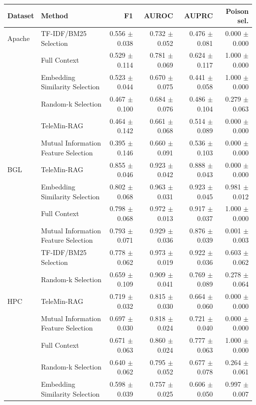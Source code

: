\begin{tabular}{llrrrr}
\toprule
Dataset & Method & F1 & AUROC & AUPRC & Poison sel. \\
\midrule
Apache & TF-IDF/BM25 Selection & 0.556 $\pm$ 0.038 & 0.732 $\pm$ 0.052 & 0.476 $\pm$ 0.081 & 0.000 $\pm$ 0.000 \\
 & Full Context & 0.529 $\pm$ 0.114 & 0.781 $\pm$ 0.069 & 0.624 $\pm$ 0.117 & 1.000 $\pm$ 0.000 \\
 & Embedding Similarity Selection & 0.523 $\pm$ 0.044 & 0.670 $\pm$ 0.075 & 0.441 $\pm$ 0.058 & 1.000 $\pm$ 0.000 \\
 & Random-k Selection & 0.467 $\pm$ 0.100 & 0.684 $\pm$ 0.076 & 0.486 $\pm$ 0.104 & 0.279 $\pm$ 0.063 \\
 & TeleMin-RAG & 0.464 $\pm$ 0.142 & 0.661 $\pm$ 0.068 & 0.514 $\pm$ 0.089 & 0.000 $\pm$ 0.000 \\
 & Mutual Information Feature Selection & 0.395 $\pm$ 0.146 & 0.660 $\pm$ 0.091 & 0.536 $\pm$ 0.103 & 0.000 $\pm$ 0.000 \\
\midrule
BGL & TeleMin-RAG & 0.855 $\pm$ 0.046 & 0.923 $\pm$ 0.042 & 0.888 $\pm$ 0.043 & 0.000 $\pm$ 0.000 \\
 & Embedding Similarity Selection & 0.802 $\pm$ 0.068 & 0.963 $\pm$ 0.031 & 0.923 $\pm$ 0.045 & 0.981 $\pm$ 0.012 \\
 & Full Context & 0.798 $\pm$ 0.068 & 0.972 $\pm$ 0.013 & 0.917 $\pm$ 0.037 & 1.000 $\pm$ 0.000 \\
 & Mutual Information Feature Selection & 0.793 $\pm$ 0.071 & 0.929 $\pm$ 0.036 & 0.876 $\pm$ 0.039 & 0.001 $\pm$ 0.003 \\
 & TF-IDF/BM25 Selection & 0.778 $\pm$ 0.062 & 0.973 $\pm$ 0.019 & 0.922 $\pm$ 0.036 & 0.603 $\pm$ 0.062 \\
 & Random-k Selection & 0.659 $\pm$ 0.109 & 0.909 $\pm$ 0.041 & 0.769 $\pm$ 0.089 & 0.278 $\pm$ 0.064 \\
\midrule
HPC & TeleMin-RAG & 0.719 $\pm$ 0.032 & 0.815 $\pm$ 0.030 & 0.664 $\pm$ 0.060 & 0.000 $\pm$ 0.000 \\
 & Mutual Information Feature Selection & 0.697 $\pm$ 0.030 & 0.818 $\pm$ 0.024 & 0.721 $\pm$ 0.040 & 0.000 $\pm$ 0.000 \\
 & Full Context & 0.671 $\pm$ 0.063 & 0.860 $\pm$ 0.024 & 0.777 $\pm$ 0.063 & 1.000 $\pm$ 0.000 \\
 & Random-k Selection & 0.640 $\pm$ 0.062 & 0.795 $\pm$ 0.052 & 0.677 $\pm$ 0.078 & 0.264 $\pm$ 0.061 \\
 & Embedding Similarity Selection & 0.598 $\pm$ 0.039 & 0.757 $\pm$ 0.025 & 0.606 $\pm$ 0.050 & 0.997 $\pm$ 0.007 \\

\end{tabular}
